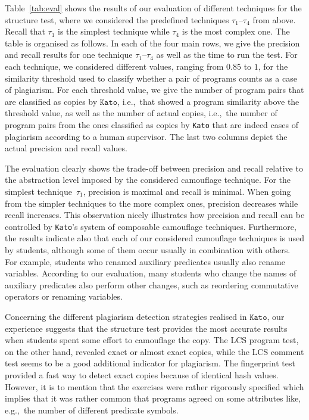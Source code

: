 \documentclass{tlp}
\newcommand{\iec}[0]{i.e.,\ }
\newcommand{\egc}[0]{e.g.,\ }
\newcommand{\kato}[0]{\texttt{Kato}\xspace}
\begin{document}
Table~\ref{tab:eval} shows the results of our evaluation of different techniques for the structure test, where
we considered the predefined techniques $\tau_{1}$--$\tau_{4}$ from above. Recall that $\tau_{1}$ is the simplest technique while $\tau_{4}$ is the most
complex one.
The table is organised as follows.
In each of the four main rows, we give the precision and recall results for one technique $\tau_{1}$--$\tau_{4}$ as well as the time to run the test.
For each technique, we considered different values, ranging from $0.85$ to $1$,  for the similarity threshold used to
classify whether a pair of programs counts as a case of plagiarism.
For each threshold value, we give the number of program pairs that are classified as copies by $\kato$, \iec that showed a program
similarity above the threshold value, as well as the number of actual copies, \iec the number of program pairs from the ones classified
 as copies by \kato that are indeed cases of plagiarism according to a human supervisor.
The last two columns depict the actual precision and recall values.

The evaluation clearly shows the trade-off between precision and recall relative to the abstraction level imposed by the considered
camouflage technique. 
For the simplest technique~$\tau_{1}$, precision is maximal and recall is minimal.
When going from the simpler techniques to
the more complex ones, precision decreases while recall increases.
This observation nicely illustrates how precision and recall can be controlled by \kato's system of composable camouflage techniques.
Furthermore, the results indicate also that each of our considered camouflage techniques is used by students, although some of them occur usually in combination with others. 
For example, students who renamed auxiliary predicates 
usually also rename variables. 
According to our evaluation, many students who change the names of auxiliary predicates also perform other changes, such as reordering commutative operators or renaming variables. 

Concerning  the different plagiarism detection strategies realised in $\kato$,
our experience suggests that the structure test provides the most accurate results when  
students spent some effort to camouflage the copy. 
The LCS program test, on the other hand, revealed  exact or almost exact copies, while the LCS comment test seems to be a good additional indicator for plagiarism. 
The fingerprint test  provided a fast way to 
 detect exact copies because of  identical hash values.
However, it is to mention that the exercises were rather rigorously specified which implies that it was rather common
that programs agreed on some attributes like, \egc the number of different predicate symbols.
\end{document}
